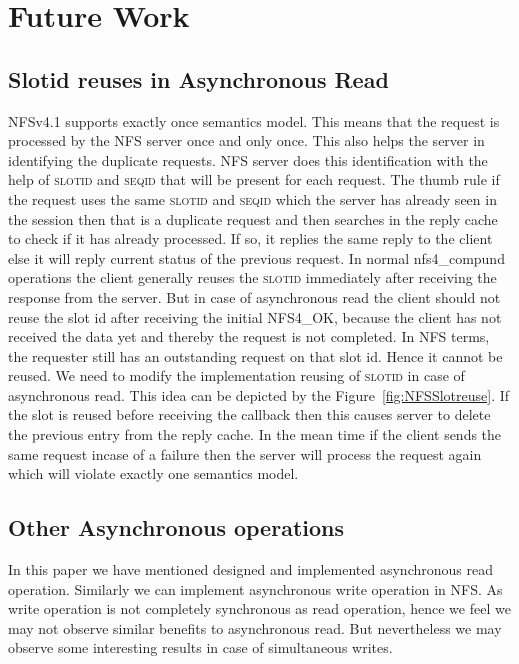 \section{Future Work}
\subsection{Slotid reuses in Asynchronous Read}

	NFSv4.1 supports exactly once semantics model. This means that the request is processed by the NFS server once and only once. This also helps the server in identifying the duplicate requests. NFS server does this identification with the help of \textsc{slotid} and \textsc{seqid} that will be present for each request. The thumb rule if the request uses the same \textsc{slotid} and \textsc{seqid} which the server has already seen in the session then that is a duplicate request and then searches in the reply cache to check if it has already processed. If so, it replies the same reply to the client else it will reply current status of the previous request. In normal nfs4\_compund operations the client generally reuses the \textsc{slotid} immediately after receiving the response from the server. But in case of asynchronous read the client should not reuse the slot id after receiving the initial \textsc{NFS4\_OK}, because the client has not received the data yet and thereby the request is not completed. In NFS terms, the requester still has an outstanding request on that slot id. Hence it cannot be reused. We need to modify the implementation reusing of \textsc{slotid} in case of asynchronous read. This idea can be depicted by the Figure~\ref{fig:NFSSlotreuse}. If the slot is reused before receiving the callback then this causes server to delete the previous entry from the reply cache. In the mean time if the client sends the same request incase of a failure then the server will process the request again which will violate exactly one semantics model.
	
\subsection{Other Asynchronous operations}

	In this paper we have mentioned designed and implemented asynchronous read operation. Similarly we can implement asynchronous write operation in NFS. As write operation is not completely synchronous as read operation, hence we feel we may not observe similar benefits to asynchronous read. But nevertheless we may observe some interesting results in case of simultaneous writes. 
	
